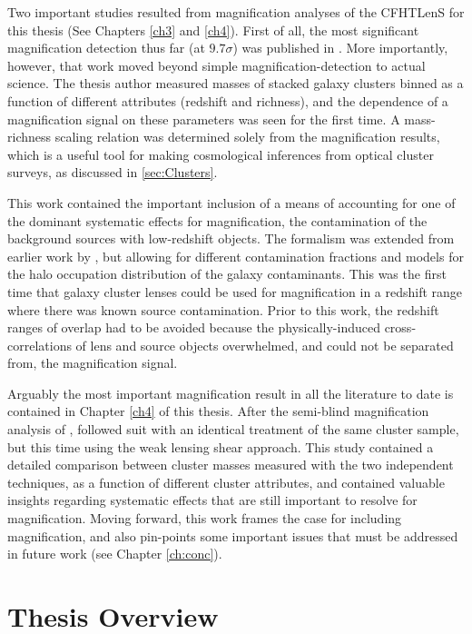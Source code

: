 Two important studies resulted from magnification analyses of the \ac{CFHTLenS} for this thesis (See Chapters \ref{ch3} and \ref{ch4}). First of all, the most significant magnification detection thus far (at $9.7\sigma$) was published in \citet{Ford14}. More importantly, however, that work moved beyond simple magnification-detection to actual science. The thesis author measured masses of stacked galaxy clusters binned as a function of different attributes (redshift and richness), and the dependence of a magnification signal on these parameters was seen for the first time. A mass-richness scaling relation was determined solely from the magnification results, which is a useful tool for making cosmological inferences from optical cluster surveys, as discussed in \ref{sec:Clusters}. 

This work contained the important inclusion of a means of accounting for one of the dominant systematic effects for magnification, the contamination of the background sources with low-redshift objects. The formalism was extended from earlier work by \citet{Hildebrandt13}, but allowing for different contamination fractions and models for the halo occupation distribution of the galaxy contaminants. This was the first time that galaxy cluster lenses could be used for magnification in a redshift range where there was known source contamination. Prior to this work, the redshift ranges of overlap had to be avoided because the physically-induced cross-correlations of lens and source objects overwhelmed, and could not be separated from, the magnification signal.

Arguably the most important magnification result in all the literature to date is contained in Chapter \ref{ch4} of this thesis. After the semi-blind magnification analysis of \citet{Ford14}, \citet{Ford15} followed suit with an identical treatment of the same cluster sample, but this time using the weak lensing shear approach. This study contained a detailed comparison between cluster masses measured with the two independent techniques, as a function of different cluster attributes, and contained valuable insights regarding systematic effects that are still important to resolve for magnification. Moving forward, this work frames the case for including magnification, and also pin-points some important issues that must be addressed in future work (see Chapter \ref{ch:conc}).

\section{Thesis Overview}
\label{sec:overview}

